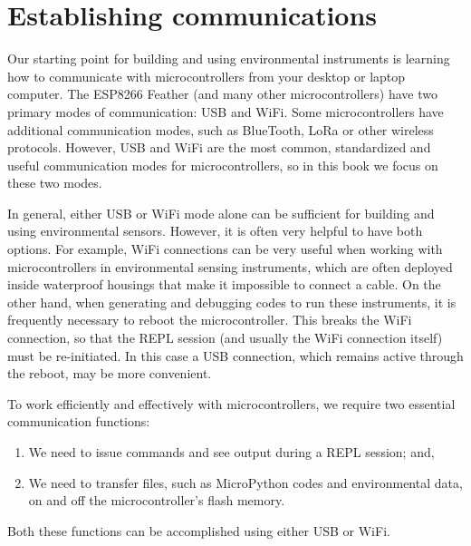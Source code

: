 
%

\section{Establishing communications}

Our starting point for building and using environmental instruments is learning how to communicate with microcontrollers from your desktop or laptop computer. 
The ESP8266 Feather (and many other microcontrollers) have two primary modes of communication: USB and WiFi. 
Some microcontrollers have additional communication modes, such as BlueTooth, LoRa or other wireless protocols.
However, USB and WiFi are the most common, standardized and useful communication modes for microcontrollers, so in this book we focus on these two modes. 

In general, either USB or WiFi mode alone can be sufficient for building and using environmental sensors.
However, it is often very helpful to have both options. 
For example, WiFi connections can be very useful when working with microcontrollers in environmental sensing instruments, which are often deployed inside waterproof housings that make it impossible to connect a cable. 
On the other hand, when generating and debugging codes to run these instruments, it is frequently necessary to reboot the microcontroller. 
This breaks the WiFi connection, so that the REPL session (and usually the WiFi connection itself) must be re-initiated. 
In this case a USB connection, which remains active through the reboot, may be more convenient.

To work efficiently and effectively with microcontrollers, we require two essential communication functions: 
\begin{enumerate}
	\item We need to issue commands and see output during a REPL session; and, 
	\item We need to transfer files, such as MicroPython codes and environmental data, on and off the microcontroller's flash memory.
\end{enumerate} 
Both these functions can be accomplished using either USB or WiFi. 

